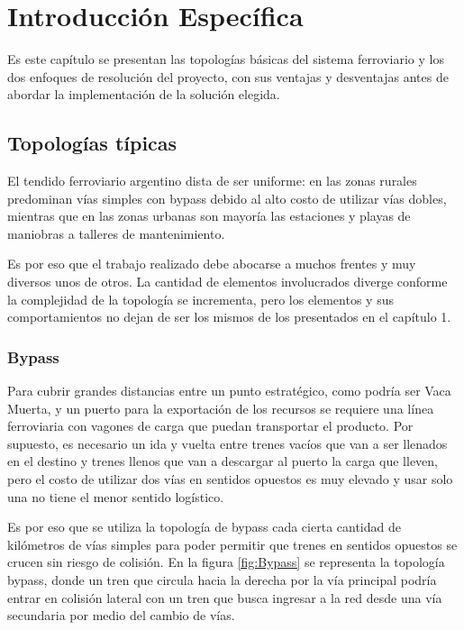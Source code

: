 \chapter{Introducción Específica} %

\label{Chapter2}

Es este capítulo se presentan las topologías básicas del sistema ferroviario y los dos enfoques de resolución del proyecto, con sus ventajas y desventajas antes de abordar la implementación de la solución elegida.

\section{Topologías típicas}
	
	El tendido ferroviario argentino dista de ser uniforme: en las zonas rurales predominan vías simples con bypass debido al alto costo de utilizar vías dobles, mientras que en las zonas urbanas son mayoría las estaciones y playas de maniobras a talleres de mantenimiento.
	
	Es por eso que el trabajo realizado debe abocarse a muchos frentes y muy diversos unos de otros. La cantidad de elementos involucrados diverge conforme la complejidad de la topología se incrementa, pero los elementos y sus comportamientos no dejan de ser los mismos de los presentados en el capítulo 1.

	\subsection{Bypass}

		Para cubrir grandes distancias entre un punto estratégico, como podría ser Vaca Muerta, y un puerto para la exportación de los recursos se requiere una línea ferroviaria con vagones de carga que puedan transportar el producto. Por supuesto, es necesario un ida y vuelta entre trenes vacíos que van a ser llenados en el destino y trenes llenos que van a descargar al puerto la carga que lleven, pero el costo de utilizar dos vías en sentidos opuestos es muy elevado y usar solo una no tiene el menor sentido logístico.
		
		Es por eso que se utiliza la topología de bypass cada cierta cantidad de kilómetros de vías simples para poder permitir que trenes en sentidos opuestos se crucen sin riesgo de colisión. En la figura \ref{fig:Bypass} se representa la topología bypass, donde un tren que circula hacia la derecha por la vía principal podría entrar en colisión lateral con un tren que busca ingresar a la red desde una vía secundaria por medio del cambio de vías.
		
